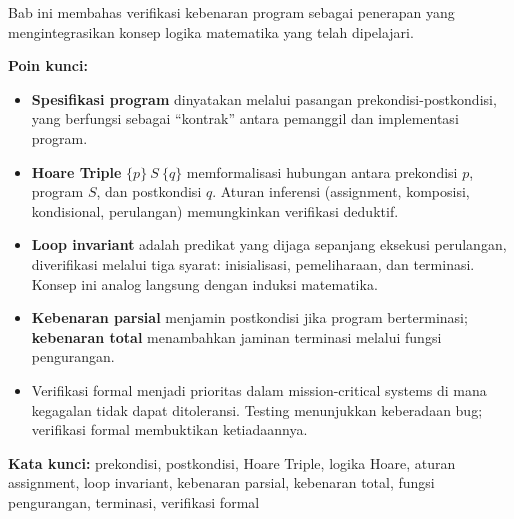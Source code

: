 \documentclass[../main]{subfiles}
\begin{document}

\begin{rangkuman}
Bab ini membahas verifikasi kebenaran program sebagai penerapan yang mengintegrasikan konsep logika matematika yang telah dipelajari.

\textbf{Poin kunci:}
\begin{itemize}
  \item \textbf{Spesifikasi program} dinyatakan melalui pasangan prekondisi-postkondisi, yang berfungsi sebagai ``kontrak'' antara pemanggil dan implementasi program.
  \item \textbf{Hoare Triple} $\{p\}\ S\ \{q\}$ memformalisasi hubungan antara prekondisi $p$, program $S$, dan postkondisi $q$. Aturan inferensi (assignment, komposisi, kondisional, perulangan) memungkinkan verifikasi deduktif.
  \item \textbf{Loop invariant} adalah predikat yang dijaga sepanjang eksekusi perulangan, diverifikasi melalui tiga syarat: inisialisasi, pemeliharaan, dan terminasi. Konsep ini analog langsung dengan induksi matematika.
  \item \textbf{Kebenaran parsial} menjamin postkondisi jika program berterminasi; \textbf{kebenaran total} menambahkan jaminan terminasi melalui fungsi pengurangan.
  \item Verifikasi formal menjadi prioritas dalam mission-critical systems di mana kegagalan tidak dapat ditoleransi. Testing menunjukkan keberadaan bug; verifikasi formal membuktikan ketiadaannya.
\end{itemize}

\textbf{Kata kunci:} prekondisi, postkondisi, Hoare Triple, logika Hoare, aturan assignment, loop invariant, kebenaran parsial, kebenaran total, fungsi pengurangan, terminasi, verifikasi formal
\end{rangkuman}

\ifSubfilesClassLoaded{
  \renewcommand{\bibname}{Daftar Pustaka}
  
  
}{}
\end{document}
